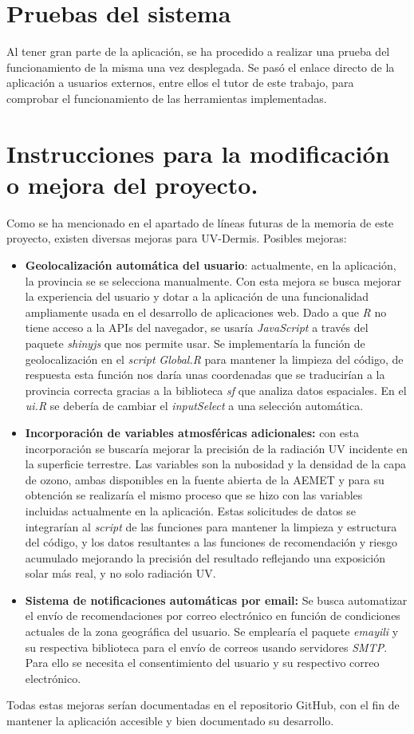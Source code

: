 \section{Pruebas del sistema}

Al tener gran parte de la aplicación, se ha procedido a realizar una prueba del funcionamiento de la misma una vez desplegada. Se pasó el enlace directo de la aplicación a usuarios externos, entre ellos el tutor de este trabajo, para comprobar el funcionamiento de las herramientas implementadas.


\section{Instrucciones para la modificación o mejora del proyecto.}
Como se ha mencionado en el apartado de líneas futuras de la memoria de este proyecto, existen diversas mejoras para UV-Dermis. Posibles mejoras:
\begin{itemize}
    \item \textbf{Geolocalización automática del usuario}: actualmente, en la aplicación, la provincia se se selecciona manualmente. Con esta mejora se busca mejorar la experiencia del usuario y dotar a la aplicación de una funcionalidad ampliamente usada en el desarrollo de aplicaciones web. Dado a que \textit{R} no tiene acceso a la APIs del navegador, se usaría \textit{JavaScript} a través del paquete \textit{shinyjs} que nos permite usar. Se implementaría la función de geolocalización en el \textit{script} \textit{Global.R} para mantener la limpieza del código, de respuesta esta función nos daría unas coordenadas que se traducirían a la provincia correcta gracias a la biblioteca \textit{sf} que analiza datos espaciales. En el \textit{ui.R} se debería de cambiar el \textit{inputSelect} a una selección automática.
    \item \textbf{Incorporación de variables atmosféricas adicionales:} con esta incorporación se buscaría mejorar la precisión de la radiación UV incidente en la superficie terrestre. Las variables son la nubosidad y la densidad de la capa de ozono, ambas disponibles en la fuente abierta de la AEMET y para su obtención se realizaría el mismo proceso que se hizo con las variables incluidas actualmente en la aplicación.
    Estas solicitudes de datos se integrarían al \textit{script} de las funciones para mantener la limpieza y estructura del código, y los datos resultantes a las funciones de recomendación y riesgo acumulado mejorando la precisión del resultado reflejando una exposición solar más real, y no solo radiación UV.
    \item \textbf{Sistema de notificaciones automáticas por email:} Se busca automatizar el envío de recomendaciones por correo electrónico en función de condiciones actuales de la zona geográfica del usuario. Se emplearía el paquete \textit{emayili} y su respectiva biblioteca para el envío de correos usando servidores \textit{SMTP}. Para ello se necesita el consentimiento del usuario y su respectivo correo electrónico. 
\end{itemize}
Todas estas mejoras serían documentadas en el repositorio GitHub, con el fin de mantener la aplicación accesible y bien documentado su desarrollo.